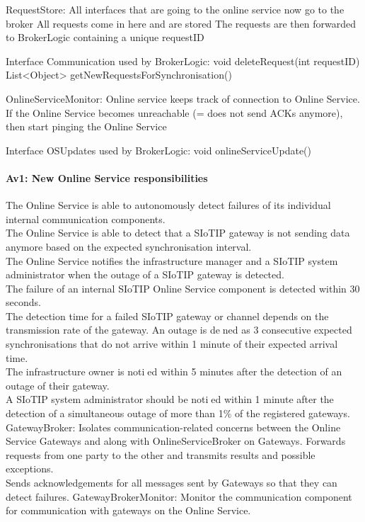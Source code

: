             RequestStore:
                All interfaces that are going to the online service now go to the broker
                All requests come in here and are stored
                The requests are then forwarded to BrokerLogic containing a unique requestID

                Interface Communication used by BrokerLogic:
                    void deleteRequest(int requestID)
                    List<Object> getNewRequestsForSynchronisation()

            OnlineServiceMonitor:
                Online service keeps track of connection to Online Service.
                If the Online Service becomes unreachable (= does not send ACKs anymore), then start pinging the Online Service

                Interface OSUpdates used by BrokerLogic:
                    void onlineServiceUpdate()


    \paragraph{Av1: New Online Service responsibilities}
        The Online Service is able to autonomously detect failures of its individual internal communication components.\\
        The Online Service is able to detect that a SIoTIP gateway is not sending data anymore based on the expected synchronisation interval.\\
        The Online Service notifies the infrastructure manager and a SIoTIP system administrator when the outage of a SIoTIP gateway is detected.\\
        The failure of an internal SIoTIP Online Service component is detected within 30 seconds.\\
        The detection time for a failed SIoTIP gateway or channel depends on the transmission rate
        of the gateway. An outage is dened as 3 consecutive expected synchronisations that do not
        arrive within 1 minute of their expected arrival time.\\
        The infrastructure owner is notied within 5 minutes after the detection of an outage of their gateway.\\
        A SIoTIP system administrator should be notied within 1 minute after the detection
        of a simultaneous outage of more than 1\% of the registered gateways.\\

        GatewayBroker: Isolates communication-related concerns between the Online Service Gateways and along with OnlineServiceBroker on Gateways.
                       Forwards requests from one party to the other and transmits results and possible exceptions. \\
                       Sends acknowledgements for all messages sent by Gateways so that they can detect failures.
        GatewayBrokerMonitor: Monitor the communication component for communication with gateways on the Online Service.

